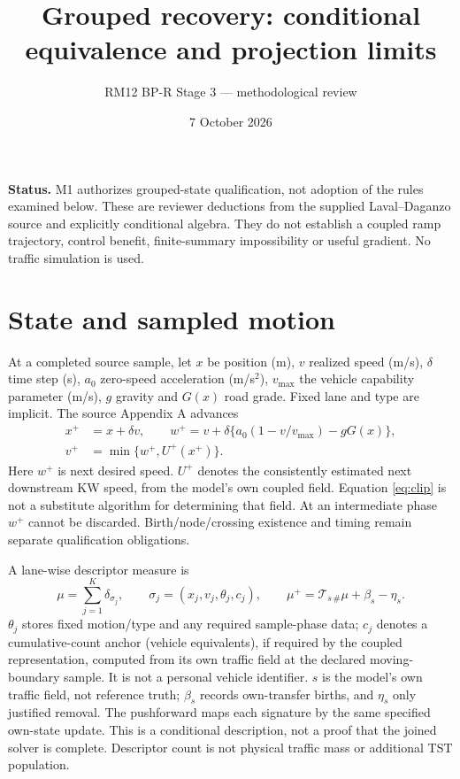 \documentclass[11pt]{article}
\title{Grouped recovery: conditional equivalence and projection limits}
\author{RM12 BP-R Stage 3 --- methodological review}
\date{7 October 2026}
\newcommand{\CM}{\mathcal{T}}
\begin{document}
\maketitle
\noindent\textbf{Status.} M1 authorizes grouped-state qualification, not adoption
of the rules examined below. These are reviewer deductions from the supplied
Laval--Daganzo source and explicitly conditional algebra. They do not establish
a coupled ramp trajectory, control benefit, finite-summary impossibility or
useful gradient. No traffic simulation is used.

\section{State and sampled motion}
At a completed source sample, let $x$ be position (m), $v$ realized speed (m/s),
$\delta$ time step (s), $a_0$ zero-speed acceleration (m/s$^2$), $v_{\max}$ the
vehicle capability parameter (m/s), $g$ gravity and $G(x)$ road grade. Fixed lane
and type are implicit. The source Appendix A advances
\begin{align}
 x^+&=x+\delta v,\qquad
 w^+=v+\delta\{a_0(1-v/v_{\max})-gG(x)\}, \label{eq:sample}\\
 v^+&=\min\{w^+,U^+(x^+)\}. \label{eq:clip}
\end{align}
Here $w^+$ is next desired speed. $U^+$ denotes the consistently estimated
next downstream KW speed, from the model's own coupled field. Equation
\eqref{eq:clip} is not a substitute algorithm for determining that field.
At an intermediate phase $w^+$ cannot be discarded. Birth/node/crossing
existence and timing remain separate qualification obligations.

A lane-wise descriptor measure is
\begin{equation}
 \mu=\sum_{j=1}^{K}\delta_{\sigma_j},\qquad
 \sigma_j=(x_j,v_j,\theta_j,c_j),\qquad
 \mu^+=\CM_{s\,\#}\mu+\beta_s-\eta_s. \label{eq:measure}
\end{equation}
$\theta_j$ stores fixed motion/type and any required sample-phase data;
$c_j$ denotes a cumulative-count anchor (vehicle equivalents), if required by
the coupled representation, computed from its own traffic field at the declared
moving-boundary sample. It is not a personal vehicle identifier.
$s$ is the model's own traffic field, not reference truth; $\beta_s$ records
own-transfer births, and $\eta_s$ only justified removal. The pushforward maps
each signature by the same specified own-state update. This is a conditional
description, not a proof that the joined solver is complete. Descriptor count
is not physical traffic mass or additional TST population.
\end{document}
